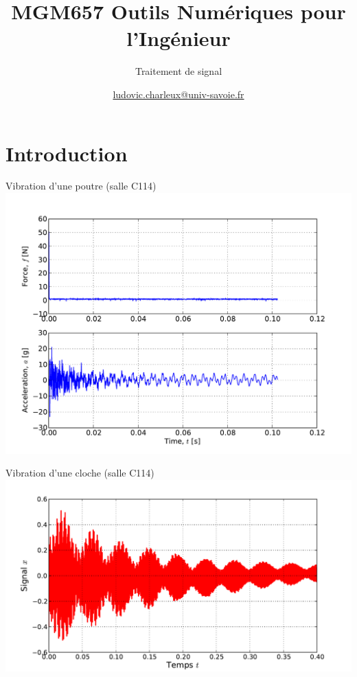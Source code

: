 \documentclass[8pt,a4paper]{beamer}
\author[LC]{\href{mailto:ludovic.charleux@univ-savoie.fr}{ludovic.charleux@univ-savoie.fr}}
\title{MGM657 Outils Numériques pour l'Ingénieur}
\subtitle{Traitement de signal}
\date{}
\institute{\url{www.polytech.univ-savoie.fr}}
\begin{document}
\begin{frame}[plain]
\titlepage
\tableofcontents
\end{frame}

\section{Introduction}

\begin{frame}{Vibration d'une poutre (salle C114)}
\includegraphics[width=.9\textwidth]{../Example_code/flex_vib.pdf}
\end{frame}

\begin{frame}{Vibration d'une cloche (salle C114)}
\includegraphics[width=.9\textwidth]{figures/cloche.pdf}
\end{frame}
\end{document}
